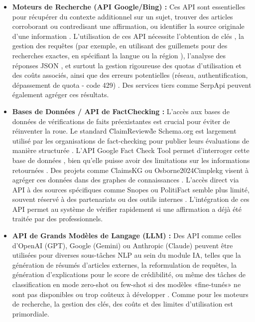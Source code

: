 \documentclass[9pt,twocolumn,french]{article}
\begin{document}
\begin{itemize}
    \item \textbf{Moteurs de Recherche (API Google/Bing) :} Ces API sont essentielles pour récupérer du contexte additionnel sur un sujet, trouver des articles corroborant ou contredisant une affirmation, ou identifier la source originale d'une information \citep{Viviani2017}. L'utilisation de ces API nécessite l'obtention de clés \citep{GoogleSearchAPI, microsoft_bing}, la gestion des requêtes (par exemple, en utilisant des guillemets pour des recherches exactes, en spécifiant la langue ou la région \citep{microsoft_bing}), l'analyse des réponses JSON \citep{GoogleSearchAPI, microsoft_bing}, et surtout la gestion rigoureuse des quotas d'utilisation et des coûts associés, ainsi que des erreurs potentielles (réseau, authentification, dépassement de quota - code 429) \citep{GoogleSearchAPI, microsoft_bing}. Des services tiers comme SerpApi peuvent également agréger ces résultats.

    \item \textbf{Bases de Données / API de Fact\-Checking :} L'accès aux bases de données de vérifications de faits préexistantes est crucial pour éviter de réinventer la roue. Le standard \`ClaimReview\` de Schema.org est largement utilisé par les organisations de fact-checking pour publier leurs évaluations de manière structurée \citep{schema_claimreview}. L'API Google Fact Check Tool permet d'interroger cette base de données \citep{Google2026Fact, schema_claimreview}, bien qu'elle puisse avoir des limitations sur les informations retournées \citep{schema_claimreview, Google2026Fact}. Des projets comme ClaimsKG ou Osborne2024Cimplekg visent à agréger ces données dans des graphes de connaissances \citep{Osborne2024Cimplekg, Thibault2025A}. L'accès direct via API à des sources spécifiques comme Snopes ou PolitiFact semble plus limité, souvent réservé à des partenariats ou des outils internes \citep{Pescuma2025}. L'intégration de ces API permet au système de vérifier rapidement si une affirmation a déjà été traitée par des professionnels.

    \item \textbf{API de Grands Modèles de Langage (LLM) :} Des API comme celles d'OpenAI (GPT), Google (Gemini) ou Anthropic (Claude) \citep{Chen2024Combating} peuvent être utilisées pour diverses sous-tâches NLP au sein du module IA, telles que la génération de résumés d'articles externes, la reformulation de requêtes, la génération d'explications pour le score de crédibilité, ou même des tâches de classification en mode zero-shot ou few-shot si des modèles «fine-tunés» ne sont pas disponibles ou trop coûteux à développer \citep{Loth2024, Chen2024Combating}. Comme pour les moteurs de recherche, la gestion des clés, des coûts et des limites d'utilisation est primordiale.
\end{itemize}
\end{document}
